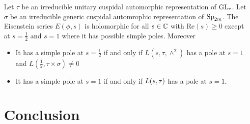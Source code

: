     \begin{Theorem}
        Let \(\tau\) be an irreducible unitary cuspidal automorphic representation of \(\operatorname{GL}_r\). Let \(\sigma\) be an irreducible generic cuspidal automrophic representation of \(\operatorname{Sp}_{2m}\). The Eisenstein series \(E(\phi, s)\) is holomorphic for all \(s\in \C\) with \(\mathrm{Re}(s)\geq 0\) except at \(s = \frac{1}{2}\) and \(s= 1\) where it has possible simple poles. Moreover 
       	\begin{itemize}
       		\item It has a simple pole at \(s= \frac{1}{2}\) if and only if \(L(s, \tau, \wedge^2)\) has a pole at \(s=1\) and \(L(\frac{1}{2}, \tau\times \sigma)\neq 0\)
       		\item It has a simple pole at \(s=1\) if and only if \(L(s, \tau\time \sigma)\) has a pole at \(s=1\).
       	\end{itemize}
    \end{Theorem}
    
    
    \chapter{Conclusion}
    

    

     